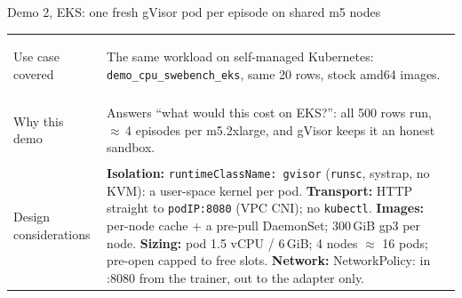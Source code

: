 \begin{frame}{Demo 2, EKS: one fresh gVisor pod per episode on shared m5 nodes}
\footnotesize
\begin{tabularx}{\textwidth}{@{}>{\bfseries\raggedright\arraybackslash}p{2.4cm}X@{}}
\toprule
Use case covered & The same workload on self-managed Kubernetes: \texttt{demo\_cpu\_swebench\_eks}, same 20 rows, stock amd64 images.\\
Why this demo & Answers ``what would this cost on EKS?'': all 500 rows run, $\approx$\,4 episodes per m5.2xlarge, and gVisor keeps it an honest sandbox.\\
Design considerations & \textbf{Isolation:} \texttt{runtimeClassName: gvisor} (\texttt{runsc}, systrap, no KVM): a user-space kernel per pod.\newline
\textbf{Transport:} HTTP straight to \texttt{podIP:8080} (VPC CNI); no \texttt{kubectl}.\newline
\textbf{Images:} per-node cache + a pre-pull DaemonSet; 300\,GiB gp3 per node.\newline
\textbf{Sizing:} pod 1.5 vCPU / 6\,GiB; 4 nodes $\approx$ 16 pods; pre-open capped to free slots.\newline
\textbf{Network:} NetworkPolicy: in :8080 from the trainer, out to the adapter only.\\
\bottomrule
\end{tabularx}
\end{frame}

